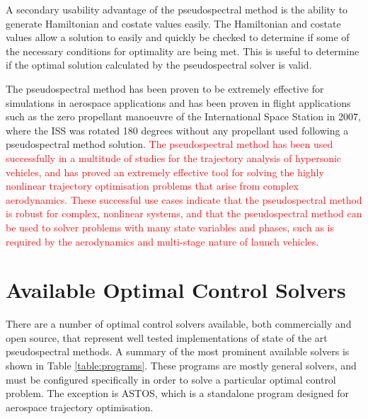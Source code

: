 A secondary usability advantage of the pseudospectral method is the ability to generate Hamiltonian and costate values easily\cite{Gong2010,Fahroo2001,Rao2009}. The Hamiltonian and costate values allow a solution to easily and quickly be checked to determine if some of the necessary conditions for optimality are being met. This is useful to determine if the optimal solution calculated by the pseudospectral solver is valid.


The pseudospectral method has been proven to be extremely effective for simulations in aerospace applications and has been proven in flight applications such as the zero propellant manoeuvre of the International Space Station in 2007, where the ISS was rotated 180 degrees without any propellant used following a pseudospectral method solution\cite{Bedrossian}. 
\textcolor{red}{
The pseudospectral method has been used successfully in a multitude of studies for the trajectory analysis of hypersonic vehicles\cite{Li2012,Josselyn2002a,Zhao2013,Tian2011,Darby2011,Chai2015,Rizvi2015,Moshman2014,Yang2017,Kodera2014}, and has proved an extremely effective tool for solving the highly nonlinear trajectory optimisation problems that arise from complex aerodynamics. 
These successful use cases indicate that the pseudospectral method is robust for complex, nonlinear systems, and that the pseudospectral method can be used to solver problems with many state variables and phases, such as is required by the aerodynamics and multi-stage nature of launch vehicles.
}
\section{Available Optimal Control Solvers}\label{sec:optsolvers}

There are a number of optimal control solvers available, both commercially and open source, that represent well tested implementations of state of the art pseudospectral methods. A summary of the most prominent available solvers is shown in Table \ref{table:programs}. These programs are mostly general solvers, and must be configured specifically in order to solve a particular optimal control problem. The exception is ASTOS\cite{astos}, which is a standalone program designed for aerospace trajectory optimisation.

